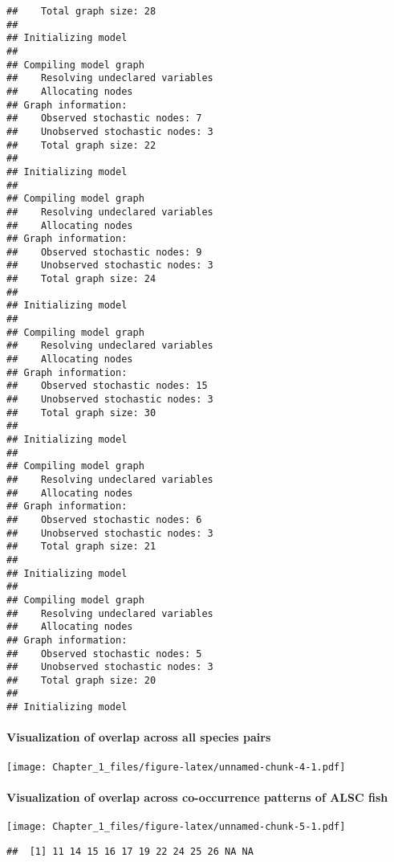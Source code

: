 \documentclass[
]{article}
\begin{document}
\begin{verbatim}
##    Total graph size: 28
## 
## Initializing model
## 
## Compiling model graph
##    Resolving undeclared variables
##    Allocating nodes
## Graph information:
##    Observed stochastic nodes: 7
##    Unobserved stochastic nodes: 3
##    Total graph size: 22
## 
## Initializing model
## 
## Compiling model graph
##    Resolving undeclared variables
##    Allocating nodes
## Graph information:
##    Observed stochastic nodes: 9
##    Unobserved stochastic nodes: 3
##    Total graph size: 24
## 
## Initializing model
## 
## Compiling model graph
##    Resolving undeclared variables
##    Allocating nodes
## Graph information:
##    Observed stochastic nodes: 15
##    Unobserved stochastic nodes: 3
##    Total graph size: 30
## 
## Initializing model
## 
## Compiling model graph
##    Resolving undeclared variables
##    Allocating nodes
## Graph information:
##    Observed stochastic nodes: 6
##    Unobserved stochastic nodes: 3
##    Total graph size: 21
## 
## Initializing model
## 
## Compiling model graph
##    Resolving undeclared variables
##    Allocating nodes
## Graph information:
##    Observed stochastic nodes: 5
##    Unobserved stochastic nodes: 3
##    Total graph size: 20
## 
## Initializing model
\end{verbatim}

\hypertarget{visualization-of-overlap-across-all-species-pairs}{%
\paragraph{Visualization of overlap across all species
pairs}\label{visualization-of-overlap-across-all-species-pairs}}

\texttt{[image: Chapter\_1\_files/figure-latex/unnamed-chunk-4-1.pdf]}

\hypertarget{visualization-of-overlap-across-co-occurrence-patterns-of-alsc-fish}{%
\paragraph{Visualization of overlap across co-occurrence patterns of
ALSC
fish}\label{visualization-of-overlap-across-co-occurrence-patterns-of-alsc-fish}}

\texttt{[image: Chapter\_1\_files/figure-latex/unnamed-chunk-5-1.pdf]}

\begin{verbatim}
##  [1] 11 14 15 16 17 19 22 24 25 26 NA NA
\end{verbatim}
\end{document}
